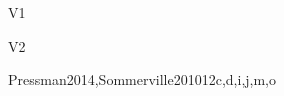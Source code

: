 \begin{syllabus}
\begin{competences}{V1}
    \item {} 
    \item {}
    \item {} 
    \item {} 
    \item {} 
    \item {} 
    \item {} 
    \item {} 
    \item {}  
\end{competences}

\begin{competences}{V2}
    \item {} 
    \item {}
    \item {} 
    \item {} 
    \item {} 
    \item {} 
    \item {} 
    \item {} 
    \item {}  
\end{competences}

\begin{unit}{\SESoftwareEvolution}{}{Pressman2014,Sommerville2010}{12}{c,d,i,j,m,o}
\begin{topics}
    \item \SESoftwareEvolutionTopicSoftware
    \item \SESoftwareEvolutionTopicSoftwareEvolution
    \item \SESoftwareEvolutionTopicCharacteristics
    \item \SESoftwareEvolutionTopicReengineering
    \item \SESoftwareEvolutionTopicSoftwareReuse
\end{topics}
\begin{learningoutcomes}
    \item \SESoftwareEvolutionLOIdentifyTheAssociatedEvolution [\Familiarity] %
    \item \SESoftwareEvolutionLOEstimateTheA [\Usage] %
    \item \SESoftwareEvolutionLOUseRefactoring [\Usage] %
    \item \SESoftwareEvolutionLODiscussTheEvolving [\Familiarity] %
    \item \SESoftwareEvolutionLOOutlineTheRegression [\Familiarity] %
    \item \SESoftwareEvolutionLODiscussTheDisadvantagesTypes [\Familiarity] %
\end{learningoutcomes}
\end{unit}


\end{syllabus}
